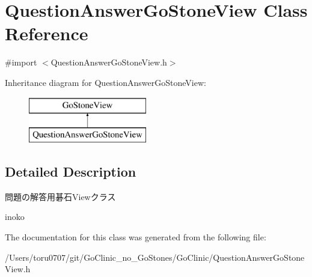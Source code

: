 \hypertarget{interface_question_answer_go_stone_view}{
\section{QuestionAnswerGoStoneView Class Reference}
\label{interface_question_answer_go_stone_view}
}


{\ttfamily \#import $<$QuestionAnswerGoStoneView.h$>$}

Inheritance diagram for QuestionAnswerGoStoneView:\begin{figure}[H]
\begin{center}
\leavevmode
\includegraphics[height=2.000000cm]{interface_question_answer_go_stone_view}
\end{center}
\end{figure}


\subsection{Detailed Description}
問題の解答用碁石Viewクラス

inoko 

The documentation for this class was generated from the following file:\begin{DoxyCompactItemize}
\item 
/Users/toru0707/git/GoClinic\_\-no\_\-GoStones/GoClinic/QuestionAnswerGoStoneView.h\end{DoxyCompactItemize}
